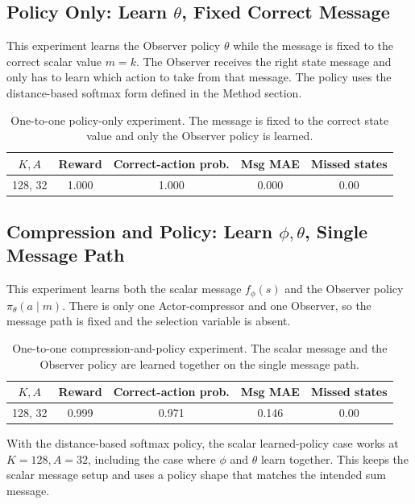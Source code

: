 \documentclass[11pt]{article}
\begin{document}
\subsection{Policy Only: Learn \(\theta\), Fixed Correct Message}

This experiment learns the Observer policy \(\theta\) while the message is fixed
to the correct scalar value \(m=k\). The Observer receives the right state
message and only has to learn which action to take from that message. The policy
uses the distance-based softmax form defined in the Method section.

\begin{table}[H]
\centering
\small
\begin{tabular}{ccccc}
\toprule
\(K,A\) & Reward & Correct-action prob. & Msg MAE & Missed states \\
\midrule
128, 32 & 1.000 & 1.000 & 0.000 & 0.00 \\
\bottomrule
\end{tabular}
\caption{One-to-one policy-only experiment. The message is fixed to the correct
state value and only the Observer policy is learned.}
\label{tab:one-to-one-policy-only}
\end{table}

\subsection{Compression and Policy: Learn \(\phi,\theta\), Single Message Path}

This experiment learns both the scalar message \(f_\phi(s)\) and the Observer
policy \(\pi_\theta(a\mid m)\). There is only one Actor-compressor and one
Observer, so the message path is fixed and the selection variable is absent.

\begin{table}[H]
\centering
\small
\begin{tabular}{ccccc}
\toprule
\(K,A\) & Reward & Correct-action prob. & Msg MAE & Missed states \\
\midrule
128, 32 & 0.999 & 0.971 & 0.146 & 0.00 \\
\bottomrule
\end{tabular}
\caption{One-to-one compression-and-policy experiment. The scalar message and
the Observer policy are learned together on the single message path.}
\label{tab:one-to-one-phi-theta}
\end{table}

With the distance-based softmax policy, the scalar learned-policy case works at
\(K=128,A=32\), including the case where \(\phi\) and \(\theta\) learn
together. This keeps the scalar message setup and uses a policy shape that
matches the intended sum message.
\end{document}
